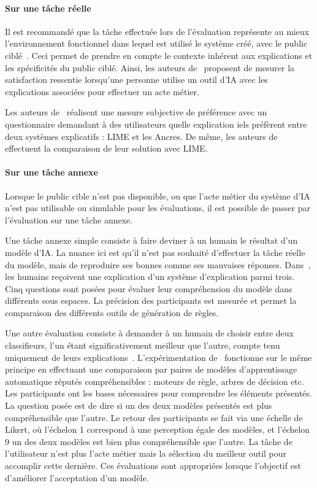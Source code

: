 \paragraph{Sur une tâche réelle}

Il est recommandé que la tâche effectuée lors de l'évaluation représente au mieux l'environnement fonctionnel dans lequel est utilisé le système créé, avec le public ciblé~\cite{Dam2018}. Ceci permet de prendre en compte le contexte inhérent aux explications et les spécificités du public ciblé. Ainsi, les auteurs de~\cite{Dam2018} proposent de mesurer la satisfaction ressentie lorsqu'une personne utilise un outil d'IA avec les explications associées pour effectuer un acte métier.

Les auteurs de~\cite{Ribeiro2018} réalisent une mesure subjective de préférence avec un questionnaire demandant à des utilisateurs quelle explication iels préfèrent entre deux systèmes explicatifs : LIME et les Ancres. De même, les auteurs de~\cite{Lakkaraju2019} effectuent la comparaison de leur solution avec LIME. %

\paragraph{Sur une tâche annexe}

Lorsque le public cible n'est pas disponible, ou que l'acte métier du système d'IA n'est pas utilisable ou simulable pour les évaluations, il est possible de passer par l'évaluation sur une tâche annexe.

Une tâche annexe simple consiste à faire deviner à un humain le résultat d'un modèle d'IA. La nuance ici est qu'il n'est pas souhaité d'effectuer la tâche réelle du modèle, mais de reproduire ses bonnes comme ses mauvaises réponses.
Dans~\cite{Lakkaraju2019}, les humains reçoivent une explication d'un système d'explication parmi trois. Cinq questions sont posées pour évaluer leur compréhension du modèle dans différents sous espaces. La précision des participants est mesurée et permet la comparaison des différents outils de génération de règles.

Une autre évaluation consiste à demander à un humain de choisir entre deux classifieurs, l'un étant significativement meilleur que l'autre, compte tenu uniquement de leurs explications~\cite{Ribeiro2016}. L'expérimentation de~\cite{Allahyari2011} fonctionne sur le même principe en effectuant une comparaison par paires de modèles d'apprentissage automatique réputés compréhensibles : moteurs de règle, arbres de décision etc. Les participants ont les bases nécessaires pour comprendre les éléments présentés. La question posée est de dire si un des deux modèles présentés est plus compréhensible que l'autre. Le retour des participants se fait via une échelle de Likert, où l'échelon 1 correspond à une perception égale des modèles, et l'échelon 9 un des deux modèles est bien plus compréhensible que l'autre. La tâche de l'utilisateur n'est plus l'acte métier mais la sélection du meilleur outil pour accomplir cette dernière. Ces évaluations sont appropriées lorsque l'objectif est d'améliorer l'acceptation d'un modèle.

